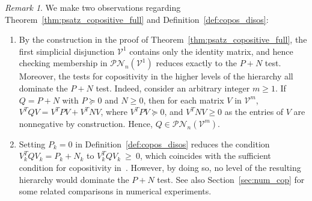 \documentclass[12pt]{article}
\newcommand{\cone}{\operatornamewithlimits{cone}}
\newcommand{\mcV}{\mathcal{V}}
\newcommand{\mcPN}{\mathcal{PN}}
\theoremstyle{remark}
\newtheorem{remark}{Remark}%
\begin{document}


\begin{remark}
We make two observations regarding Theorem~\ref{thm:psatz_copositive_full} and Definition~\ref{def:copos_disos}:
\begin{enumerate}
\item [(i)]
By the construction in the proof of Theorem~\ref{thm:psatz_copositive_full}, the first simplicial disjunction $\mcV^1$ contains only the identity matrix, 
and hence checking membership in $\mcPN_n(\mcV^1)$ reduces exactly to the $P+N$ test.
Moreover, the tests for copositivity in the higher levels of the hierarchy all dominate the $P+N$ test. Indeed, consider an arbitrary integer $m\ge 1$. If $Q = P + N$ with $P \succeq 0$ and $N \geq 0$, then for each matrix $V$ in $\mcV^m$, $V^T Q V = V^T P V + V^T N V$, where $V^T P V \succeq 0$, and $V^T N V \geq 0$ as the entries of $V$ are nonnegative by construction. Hence, $Q \in \mcPN_n(\mcV^m)$.

\item [(ii)]
Setting $P_k = 0$ in Definition~\ref{def:copos_disos} reduces the condition 
$V_k^T Q V_k= P_k + N_k$ to $V_k^T Q V_k~\geq~0$, 
which coincides with the sufficient condition for copositivity in~\cite[Theorem 1]{BUNDFUSS2008}.
However, by doing so, no level of the resulting hierarchy would dominate the $P+N$ test. See also Section~\ref{sec:num_cop} for some related comparisons in numerical experiments.
\end{enumerate}
\end{remark}
\end{document}
